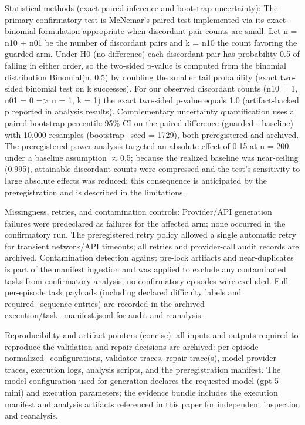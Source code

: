 \documentclass[conference]{IEEEtran}
\begin{document}
Statistical methods (exact paired inference and bootstrap uncertainty): The primary confirmatory test is McNemar's paired test implemented via its exact-binomial formulation appropriate when discordant-pair counts are small. Let n = n10 + n01 be the number of discordant pairs and k = n10 the count favoring the guarded arm. Under H0 (no difference) each discordant pair has probability 0.5 of falling in either order, so the two-sided p-value is computed from the binomial distribution Binomial(n, 0.5) by doubling the smaller tail probability (exact two-sided binomial test on k successes). For our observed discordant counts (n10 = 1, n01 = 0 => n = 1, k = 1) the exact two-sided p-value equals 1.0 (artifact-backed p reported in analysis results). Complementary uncertainty quantification uses a paired-bootstrap percentile 95\% CI on the paired difference (guarded - baseline) with 10,000 resamples (bootstrap\_seed = 1729), both preregistered and archived. The preregistered power analysis targeted an absolute effect of 0.15 at n = 200 under a baseline assumption \ensuremath{\approx}0.5; because the realized baseline was near-ceiling (0.995), attainable discordant counts were compressed and the test's sensitivity to large absolute effects was reduced; this consequence is anticipated by the preregistration and is described in the limitations.

Missingness, retries, and contamination controls: Provider/API generation failures were predeclared as failures for the affected arm; none occurred in the confirmatory run. The preregistered retry policy allowed a single automatic retry for transient network/API timeouts; all retries and provider-call audit records are archived. Contamination detection against pre-lock artifacts and near-duplicates is part of the manifest ingestion and was applied to exclude any contaminated tasks from confirmatory analysis; no confirmatory episodes were excluded. Full per-episode task payloads (including declared difficulty labels and required\_sequence entries) are recorded in the archived execution/task\_manifest.jsonl for audit and reanalysis.

Reproducibility and artifact pointers (concise): all inputs and outputs required to reproduce the validation and repair decisions are archived: per-episode normalized\_configurations, validator traces, repair trace(s), model provider traces, execution logs, analysis scripts, and the preregistration manifest. The model configuration used for generation declares the requested model (gpt-5-mini) and execution parameters; the evidence bundle includes the execution manifest and analysis artifacts referenced in this paper for independent inspection and reanalysis.
\end{document}

